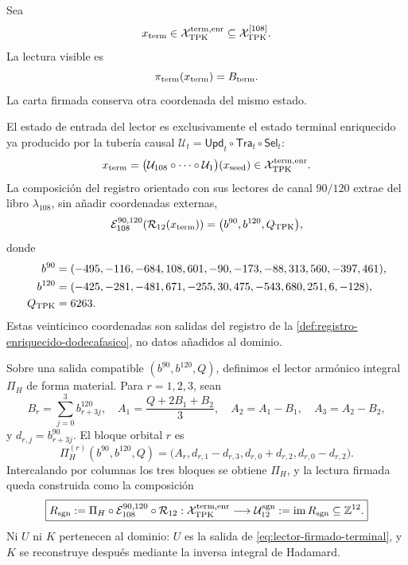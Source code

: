 Sea
\[
 x_{\rm term}\in
 \mathcal X_{\rm TPK}^{\rm term,enr}
 \subseteq\mathcal X_{\rm TPK}^{[108]}.
\]
La lectura visible es
\[
 \pi_{\rm term}(x_{\rm term})=B_{\rm term}.
\]
La carta firmada conserva otra coordenada del mismo estado.

\begin{definition}
\label{def:subespacio-firmado-terminal}
El estado de entrada del lector es exclusivamente el estado terminal
enriquecido ya producido por la tubería causal
\(\mathcal U_t=\mathsf{Upd}_t\circ\mathsf{Tra}_t\circ\mathsf{Sel}_t\):
\begin{equation}
 x_{\rm term}
 =\bigl(\mathcal U_{108}\circ\cdots\circ\mathcal U_1\bigr)
   (x_{\rm seed})
 \in\mathcal X_{\rm TPK}^{\rm term,enr}.
 \label{eq:subespacio-firmado-terminal}
\end{equation}
La composición del registro orientado con sus lectores de canal \(90/120\)
extrae del libro \(\lambda_{108}\), sin añadir coordenadas externas,
\begin{equation}
 \mathcal E_{108}^{90,120}\!\left(\mathcal R_{12}(x_{\rm term})\right)
 =\bigl(b^{90},b^{120},Q_{\rm TPK}\bigr),
 \label{eq:canales-ledger-previos-u}
\end{equation}
donde
\begin{align}
 b^{90}={}&(-495,-116,-684,108,601,-90,
             -173,-88,313,560,-397,461),\notag\\
 b^{120}={}&(-425,-281,-481,671,-255,30,
              475,-543,680,251,6,-128),\notag\\
 Q_{\rm TPK}={}&6263.\notag
\end{align}
Estas veinticinco coordenadas son salidas del registro de la
\cref{def:registro-enriquecido-dodecafasico}, no datos añadidos al dominio.

Sobre una salida compatible \((b^{90},b^{120},Q)\), definimos el lector
armónico integral \(\Pi_H\) de forma material. Para \(r=1,2,3\), sean
\begin{equation}
 B_r=\sum_{j=0}^{3}b^{120}_{r+3j},
 \quad
 A_1=\frac{Q+2B_1+B_2}{3},
 \quad A_2=A_1-B_1,
 \quad A_3=A_2-B_2,
 \label{eq:lector-armonico-a-desde-ledger}
\end{equation}
y \(d_{r,j}=b^{90}_{r+3j}\). El bloque orbital \(r\) es
\begin{equation}
 \Pi_H^{(r)}(b^{90},b^{120},Q)
 =\bigl(A_r,d_{r,1}-d_{r,3},
              d_{r,0}+d_{r,2},d_{r,0}-d_{r,2}\bigr).
 \label{eq:lector-armonico-bloque-desde-ledger}
\end{equation}
Intercalando por columnas los tres bloques se obtiene \(\Pi_H\), y la
lectura firmada queda construida como la composición
\begin{equation}
 \boxed{
 R_{\rm sgn}:=
 \Pi_H\circ\mathcal E_{108}^{90,120}\circ\mathcal R_{12}:
 \mathcal X_{\rm TPK}^{\rm term,enr}
 \longrightarrow\mathcal U_{12}^{\rm sgn}:=
 \operatorname{im}R_{\rm sgn}\subseteq\mathbb Z^{12}.}
 \label{eq:lector-firmado-terminal}
\end{equation}
Ni \(U\) ni \(K\) pertenecen al dominio: \(U\) es la salida de
\eqref{eq:lector-firmado-terminal}, y \(K\) se reconstruye después mediante
la inversa integral de Hadamard.
\end{definition}

